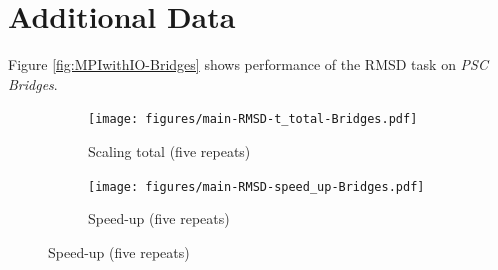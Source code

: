 
\section{Additional Data}
\label{sec:supplement}

Figure \ref{fig:MPIwithIO-Bridges} shows performance of the RMSD task on \emph{PSC Bridges}. 

\begin{figure}[!htb]
  \centering
  \begin{subfigure}{.4\textwidth}
    \texttt{[image: figures/main-RMSD-t\_total-Bridges.pdf]}
    \caption{Scaling total (five repeats)}
    \label{fig:MPIscaling-Bridges}
  \end{subfigure}
  \hfill
  \begin{subfigure}{.4\textwidth}
    \texttt{[image: figures/main-RMSD-speed\_up-Bridges.pdf]}
    \caption{Speed-up (five repeats)}
    \label{fig:MPIspeedup-Bridges}
  \end{subfigure}
  \bigskip


\end{figure}
